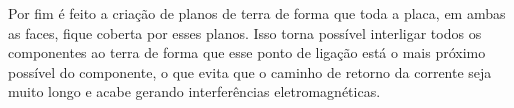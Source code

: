     \begin{figure}[h!]
            \captionsetup{width=10cm}
   \end{figure}



Por fim é feito a criação de planos de terra de forma que toda a placa, em ambas as faces, fique coberta por esses planos. Isso torna possível interligar todos os componentes ao terra de forma que esse ponto de ligação está o mais próximo possível do componente, o que evita que o caminho de retorno da corrente seja muito longo e acabe gerando interferências eletromagnéticas.

    \begin{figure}[h!]
            \captionsetup{width=10cm}
   \end{figure}


